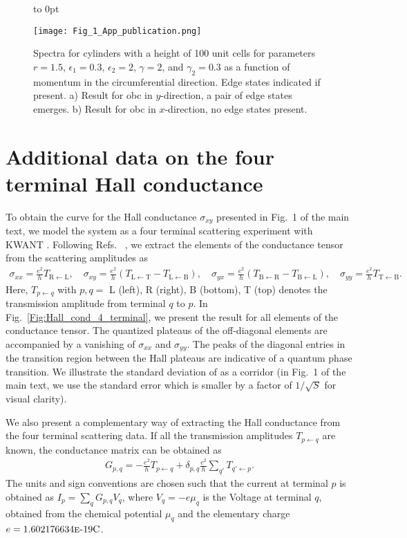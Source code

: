 \documentclass[aps,prb,amsmath,amssymb,twocolumn, superscriptaddress]{revtex4-2}
\begin{document}
\begin{figure}[htp]	 
{
    \vbox to 0pt {
            \raggedright
            \textcolor{white}{
            }
        }
}
{\texttt{[image: Fig\_1\_App\_publication.png]}}
\caption{Spectra for cylinders with a height of 100 unit cells for parameters $r = 1.5$, $\epsilon_1 = 0.3$, $\epsilon_2 = 2$, $\gamma  =2$, and $\gamma_2 = 0.3$ as a function of momentum in the circumferential direction. Edge states indicated if present. a) Result for \gls{obc} in $y$-direction, a pair of edge states emerges. b) Result for \gls{obc} in $x$-direction, no edge states present.
 }\label{Fig:Edge_states}
\end{figure}

\section{Additional data on the four terminal Hall conductance}
To obtain the curve for the Hall conductance $\sigma_{xy}$ presented in Fig.~1 of the main text, we model the system as a four terminal scattering experiment with KWANT \cite{Kwant_App, Kwant_Mumps_App}. Following Refs.~ \cite{Datta_App, 4_terminal_Hall_App}, we extract the elements of the conductance tensor from the scattering amplitudes as 
\begin{align}
\sigma_{xx}  = \frac{e^2}{h} T_\mathrm{R \leftarrow L}, \quad \sigma_{xy}  = \frac{e^2}{h} (T_\mathrm{L \leftarrow T} - T_\mathrm{L \leftarrow B}), \quad \sigma_{yx}  = \frac{e^2}{h} (T_\mathrm{B \leftarrow R} - T_\mathrm{B \leftarrow L}), \quad \sigma_{yy}  = \frac{e^2}{h} T_\mathrm{T \leftarrow B}.
\end{align}
Here, $T_{p \leftarrow q}$ with $p, q = $ L (left), R (right), B (bottom), T (top) denotes the transmission amplitude from terminal $q$ to $p$. In Fig.~\ref{Fig:Hall_cond_4_terminal}, we present the result for all elements of the conductance tensor. The quantized plateaus of the off-diagonal elements are accompanied by a vanishing of $\sigma_{xx}$ and $\sigma_{yy}$. The peaks of the diagonal entries in the transition region between the Hall plateaus are indicative of a quantum phase transition. We illustrate the standard deviation of as a corridor (in Fig.~1 of the main text, we use the standard error which is smaller by a factor of $1 / \sqrt{S}$ for visual clarity).

We also present a complementary way of extracting the Hall conductance from the four terminal scattering data. If all the transmission amplitudes $T_{p \leftarrow q}$ are known, the conductance matrix can be obtained as 
\begin{align}
G_{p, q} =  - \frac{e^2}{h} T_{p \leftarrow q} + \delta_{p, q} \frac{e^2}{h} \sum_{q'} T_{q' \leftarrow p}.
\end{align}
The units and sign conventions are chosen such that the current at terminal $p$ is obtained as $I_p = \sum_{q} G_{p,q} V_q$, where $V_q = -e \mu_q$ is the Voltage at terminal $q$, obtained from the chemical potential $\mu_q$ and the elementary charge $e = 1.602176634 \text{\textsc{e-}}19\mathrm{C}$.  
\end{document}
